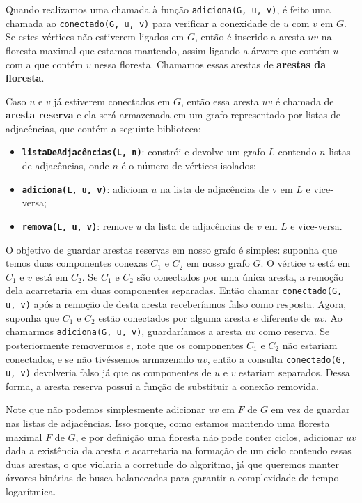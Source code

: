 Quando realizamos uma chamada à função \texttt{adiciona(G, u, v)}, é feito uma chamada ao \texttt{conectado(G, u, v)} para verificar a conexidade de $u$ com $v$ em $G$. Se estes vértices não estiverem ligados em $G$, então é inserido a aresta $uv$ na floresta maximal que estamos mantendo, assim ligando a árvore que contém $u$ com a que contém $v$ nessa floresta. Chamamos essas arestas de \textbf{arestas da floresta}.

Caso $u$ e $v$ já estiverem conectados em $G$, então essa aresta $uv$ é chamada de \textbf{aresta reserva} e ela será armazenada em um grafo representado por listas de adjacências, que contém a seguinte biblioteca:

\begin{itemize}
    \item \texttt{\textbf{listaDeAdjacências(L, n)}}: constrói e devolve um grafo $L$ contendo $n$ listas de adjacências, onde $n$ é o número de vértices isolados;
    \item \texttt{\textbf{adiciona(L, u, v)}}: adiciona $u$ na lista de adjacências de v em $L$ e vice-versa;
    \item \texttt{\textbf{remova(L, u, v)}}: remove $u$ da lista de adjacências de $v$ em $L$ e vice-versa.
\end{itemize} 

O objetivo de guardar arestas reservas em nosso grafo é simples: suponha que temos duas componentes conexas $C_1$ e $C_2$ em nosso grafo $G$. O vértice $u$ está em $C_1$ e $v$ está em $C_2$. Se $C_1$ e $C_2$ são conectados por uma única aresta, a remoção dela acarretaria em duas componentes separadas. Então chamar \texttt{conectado(G, u, v)} após a remoção de desta aresta receberíamos falso como resposta. Agora, suponha que $C_1$ e $C_2$ estão conectados por alguma aresta $e$ diferente de $uv$. Ao chamarmos \texttt{adiciona(G, u, v)}, guardaríamos a aresta $uv$ como reserva. Se posteriormente removermos $e$, note que os componentes $C_1$ e $C_2$ não estariam conectados, e se não tivéssemos armazenado $uv$, então a consulta \texttt{conectado(G, u, v)} devolveria falso já que os componentes de $u$ e $v$ estariam separados. Dessa forma, a aresta reserva possui a função de substituir a conexão removida. 

Note que não podemos simplesmente adicionar $uv$ em $F$ de $G$ em vez de guardar nas listas de adjacências. Isso porque, como estamos mantendo uma floresta maximal $F$ de $G$, e por definição uma floresta não pode conter ciclos, adicionar $uv$ dada a existência da aresta $e$ acarretaria na formação de um ciclo contendo essas duas arestas, o que violaria a corretude do algoritmo, já que queremos manter árvores binárias de busca balanceadas para garantir a complexidade de tempo logarítmica.

